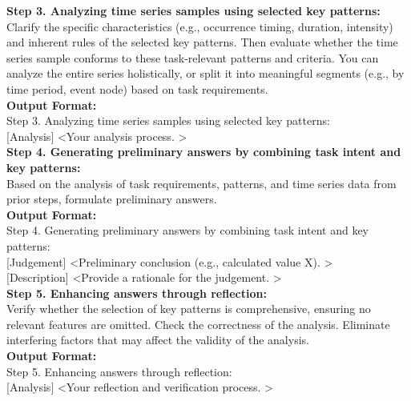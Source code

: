\documentclass{article}
\theoremstyle{plain}
\theoremstyle{definition}
\theoremstyle{remark}
\begin{document}
\begin{prompt}
\textbf{Step 3. Analyzing time series samples using selected key patterns: }\\
Clarify the specific characteristics (e.g., occurrence timing, duration, intensity) and inherent rules of the selected key patterns. Then evaluate whether the time series sample conforms to these task-relevant patterns and criteria.  You can analyze the entire series holistically, or split it into meaningful segments (e.g., by time period, event node) based on task requirements. \\
\textbf{Output Format:} \\
Step 3. Analyzing time series samples using selected key patterns: \\
{[Analysis] \textless Your analysis process. \textgreater} \\

\textbf{Step 4. Generating preliminary answers by combining task intent and key patterns: }\\
Based on the analysis of task requirements, patterns, and time series data from prior steps, formulate preliminary answers. \\
\textbf{Output Format:} \\
Step 4. Generating preliminary answers by combining task intent and key patterns: \\
{[Judgement] \textless Preliminary conclusion (e.g., calculated value X). \textgreater} \\
{[Description] \textless Provide a rationale for the judgement. \textgreater} \\

\textbf{Step 5. Enhancing answers through reflection: }\\
Verify whether the selection of key patterns is comprehensive, ensuring no relevant features are omitted. Check the correctness of the analysis. Eliminate interfering factors that may affect the validity of the analysis. \\
\textbf{Output Format:} \\
Step 5. Enhancing answers through reflection: \\
{[Analysis] \textless Your reflection and verification process. \textgreater} \\


\end{prompt}
\end{document}
